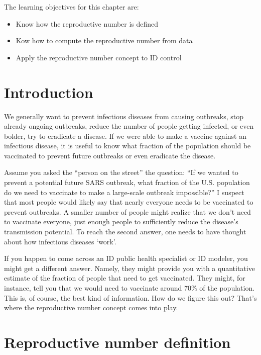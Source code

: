 \documentclass[]{book}
\providecommand{\tightlist}{%
  \setlength{\itemsep}{0pt}\setlength{\parskip}{0pt}}
\theoremstyle{definition}
\theoremstyle{definition}
\theoremstyle{definition}
\theoremstyle{remark}
\begin{document}
The learning objectives for this chapter are:

\begin{itemize}
\tightlist
\item
  Know how the reproductive number is defined
\item
  Kow how to compute the reproductive number from data
\item
  Apply the reproductive number concept to ID control
\end{itemize}

\hypertarget{introduction-2}{%
\section{Introduction}\label{introduction-2}}

We generally want to prevent infectious diseases from causing outbreaks,
stop already ongoing outbreaks, reduce the number of people getting
infected, or even bolder, try to eradicate a disease. If we were able to
make a vaccine against an infectious disease, it is useful to know what
fraction of the population should be vaccinated to prevent future
outbreaks or even eradicate the disease.

Assume you asked the ``person on the street'' the question: ``If we
wanted to prevent a potential future SARS outbreak, what fraction of the
U.S. population do we need to vaccinate to make a large-scale outbreak
impossible?'' I suspect that most people would likely say that nearly
everyone needs to be vaccinated to prevent outbreaks. A smaller number
of people might realize that we don't need to vaccinate everyone, just
enough people to sufficiently reduce the disease's transmission
potential. To reach the second answer, one needs to have thought about
how infectious diseases `work'.

If you happen to come across an ID public health specialist or ID
modeler, you might get a different answer. Namely, they might provide
you with a quantitative estimate of the fraction of people that need to
get vaccinated. They might, for instance, tell you that we would need to
vaccinate around 70\% of the population. This is, of course, the best
kind of information. How do we figure this out? That's where the
reproductive number concept comes into play.

\hypertarget{reproductive-number-definition}{%
\section{Reproductive number
definition}\label{reproductive-number-definition}}
\end{document}
